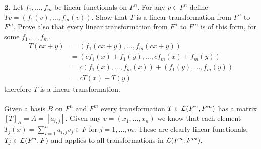 \documentclass[11pt]{amsart}
\theoremstyle{definition}  %
\begin{document}
\newpage
\vskip 0.1cm
\noindent
{\bf 2.} Let $f_1, \ldots, f_m$ be linear functionals on $F^n$. For any $v \in F^n$  define $Tv = (f_1(v), \ldots, f_m(v))$. Show
that $T$ is a linear transformation from $F^n$ to $F^m$. Prove also that every linear transformation from $F^n$ to $F^m$ is 
of this form, for some $f_1, \ldots, f_m$. \\
\begin{align*}
	T(cx+y) &= (f_1(cx+y),\dots, f_m(cx+y)) \\
	&= (cf_1(x)+f_1(y),\dots, cf_m(x)+f_m(y)) \\
	&= c(f_1(x),\dots,f_m(x))+ (f_1(y),\dots, f_m(y)) \\
	&= cT(x)+T(y)
\end{align*}therefore $T$ is a linear transformation.\\
\\
Given a basis $B$ on $F^n$ and $F^m$ every transformation $T\in \mathcal{L}(F^n, F^m)$ has a matrix $[T]_B = A = [a_{i,j}]$.  Given any $v=(x_1,\dots,x_n)$ we know that each element $T_j(x) = \sum_{i=1}^n a_{i,j}v_j \in F$ for $j=1,\dots,m$.  These are clearly linear functionals, $T_j \in \mathcal{L}(F^n, F)$ and applies to all transformations in $\mathcal{L}(F^n,F^m)$.
\\
\end{document}
